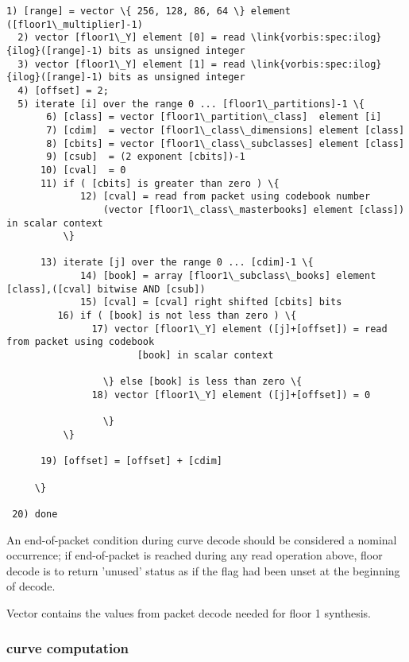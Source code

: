 \begin{Verbatim}[commandchars=\\\{\}]
  1) [range] = vector \{ 256, 128, 86, 64 \} element ([floor1\_multiplier]-1)
  2) vector [floor1\_Y] element [0] = read \link{vorbis:spec:ilog}{ilog}([range]-1) bits as unsigned integer
  3) vector [floor1\_Y] element [1] = read \link{vorbis:spec:ilog}{ilog}([range]-1) bits as unsigned integer
  4) [offset] = 2;
  5) iterate [i] over the range 0 ... [floor1\_partitions]-1 \{
       6) [class] = vector [floor1\_partition\_class]  element [i]
       7) [cdim]  = vector [floor1\_class\_dimensions] element [class]
       8) [cbits] = vector [floor1\_class\_subclasses] element [class]
       9) [csub]  = (2 exponent [cbits])-1
      10) [cval]  = 0
      11) if ( [cbits] is greater than zero ) \{
             12) [cval] = read from packet using codebook number
                 (vector [floor1\_class\_masterbooks] element [class]) in scalar context
          \}

      13) iterate [j] over the range 0 ... [cdim]-1 \{
             14) [book] = array [floor1\_subclass\_books] element [class],([cval] bitwise AND [csub])
             15) [cval] = [cval] right shifted [cbits] bits
	     16) if ( [book] is not less than zero ) \{
	           17) vector [floor1\_Y] element ([j]+[offset]) = read from packet using codebook
                       [book] in scalar context

                 \} else [book] is less than zero \{
	           18) vector [floor1\_Y] element ([j]+[offset]) = 0

                 \}
          \}

      19) [offset] = [offset] + [cdim]

     \}

 20) done
\end{Verbatim}

An end-of-packet condition during curve decode should be considered a
nominal occurrence; if end-of-packet is reached during any read
operation above, floor decode is to return 'unused' status as if the
\varname{[nonzero]} flag had been unset at the beginning of decode.


Vector \varname{[floor1\_Y]} contains the values from packet decode
needed for floor 1 synthesis.



\subsubsection{curve computation} \label{vorbis:spec:floor1-synth}

